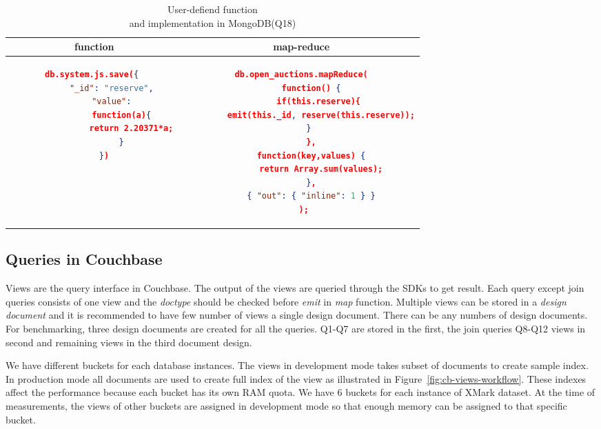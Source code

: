 \begin{longtable}[hbt]{c|c}
    \caption{ User-defiend function \\and implementation in MongoDB(Q18)}
    \label{tbl:mongodb-q18}\\
    {function } & {map-reduce}\\
	\hline
\begin{minipage}{.3\textwidth}
\begin{lstlisting}[language=JSON,basicstyle =\scriptsize]
    db.system.js.save({ 
        "_id": "reserve", 
        "value": 
            function(a){ 
                return 2.20371*a; 
            } 
    })
\end{lstlisting}
\end{minipage} &
\begin{minipage}{.4\textwidth}
\begin{lstlisting}[language=JSON,basicstyle =\scriptsize]
db.open_auctions.mapReduce(
    function() {
       if(this.reserve){
        emit(this._id, reserve(this.reserve));
       }    
    },
    function(key,values) {
        return Array.sum(values);
    },
    { "out": { "inline": 1 } }
 );
\end{lstlisting}
\end{minipage}
\end{longtable}


\subsection{Queries in Couchbase}
Views are the query interface in Couchbase. The output of the views are queried through the SDKs to get result. Each query except join queries consists of one view and the \textit{doctype} should be checked before \textit{emit} in \textit{map} function. Multiple views can be stored in a \textit{design document} and it is recommended to have few number of views a single design document. There can be any numbers of design documents. For benchmarking, three design documents are created for all the queries. Q1-Q7 are stored in the first, the join queries Q8-Q12 views in second and remaining views in the third document design. 
\par
We have different buckets for each database instances. The views in development mode takes subset of documents to create sample index. In production mode all documents are used to create full index of the view  as illustrated in Figure~\ref{fig:cb-views-workflow}. These indexes affect the performance because each bucket has its own RAM quota. We have 6 buckets for each instance of XMark dataset. At the time of measurements, the views of other buckets are assigned in development mode so that enough memory can be assigned to that specific bucket. 
\par

